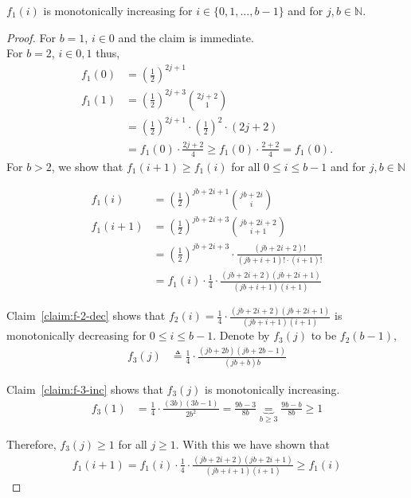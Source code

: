 \begin{claim}\label{claim:holes-pi-mono}
$f_1(i)$ is monotonically increasing for $i \in \{0,1,\dots,b-1\}$ and for $j,b \in \mathds{N}$. 
\end{claim}

\begin{proof}
For $b=1$, $i \in {0}$ and the claim is immediate.\\
For $b=2$, $i \in {0,1}$ thus,
\begin{align*}
    f_1(0) &= \left(\frac{1}{2}\right)^{2j+1} \\
    f_1(1) &= \left(\frac{1}{2}\right)^{2j+3} {{2j+2} \choose 1} \\
            &= \left(\frac{1}{2}\right)^{2j+1} \cdot \left(\frac{1}{2}\right)^{2} \cdot (2j+2)\\
            &= f_1(0) \cdot \frac{2j+2}{4} \geq f_1(0) \cdot \frac{2+2}{4} = f_1(0).
\end{align*}
For $b>2$, we show that $f_1(i+1)\geq f_1(i)$ for all $0 \leq i \leq b-1$ and for $j,b \in \mathds{N}$

\begin{align*}
    f_1(i) &= \left(\frac{1}{2}\right)^{jb + 2i +1} {{jb+2i} \choose {i}} \\
    f_1(i+1) &= \left(\frac{1}{2}\right)^{jb + 2i +3} {{jb+2i+2} \choose {i+1}} \\
    &= \left(\frac{1}{2}\right)^{jb + 2i +3} \cdot \frac{(jb+2i+2)!}{(jb+i+1)!\cdot(i+1)!} \\
    &= f_1(i) \cdot \frac{1}{4} \cdot \frac{(jb+2i+2)(jb+2i+1)}{(jb+i+1)(i+1)}
\end{align*}

Claim~\ref{claim:f-2-dec} shows that $f_2(i) = \frac{1}{4} \cdot \frac{(jb+2i+2)(jb+2i+1)}{(jb+i+1)(i+1)} $ is monotonically decreasing for $0\leq{i}\leq{b-1}$. 
Denote by $f_3(j)$ to be $f_2(b-1)$,
\begin{align}
    f_3(j) &\triangleq \frac{1}{4} \cdot \frac{(jb+2b)(jb+2b-1)}{(jb+b)b}
\end{align}

Claim~\ref{claim:f-3-inc} shows that $f_3(j)$ is monotonically increasing. 
\begin{align*}
    f_3(1) &= \frac{1}{4} \cdot \frac{(3b)(3b-1)}{2b^2} = \frac{9b-3}{8b} \underbrace{=}_{b\geq 3} \frac{9b-b}{8b} \geq 1
\end{align*}

Therefore, $f_3(j) \geq 1$ for all $j\geq1$.
With this we have shown that 
\begin{align*}
f_1(i+1) = f_1(i) \cdot \frac{1}{4} \cdot \frac{(jb+2i+2)(jb+2i+1)}{(jb+i+1)(i+1)} \geq f_1(i)
\end{align*}

\end{proof}

